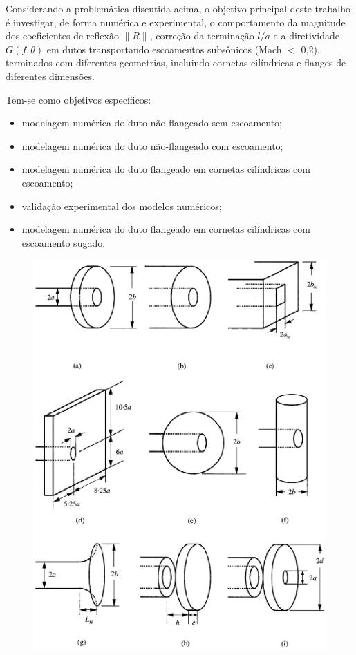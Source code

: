 Considerando a problemática discutida acima, o objetivo principal deste trabalho é investigar, de forma numérica e experimental, o comportamento da magnitude dos coeficientes de reflexão $\|R\|$, correção da terminação $l/a$ e a diretividade $G(f,\theta)$ em dutos transportando escoamentos subsônicos (Mach $<$ 0,2), terminados com diferentes geometrias, incluindo cornetas cilíndricas e flanges de diferentes dimensões.

Tem-se como objetivos específicos:
\begin{itemize}
    \item modelagem numérica do duto não-flangeado sem escoamento;
    \item modelagem numérica do duto não-flangeado com escoamento;
    \item modelagem numérica do duto flangeado em cornetas cilíndricas com escoamento;
    \item validação experimental dos modelos numéricos;
    \item modelagem numérica do duto flangeado em cornetas cilíndricas com escoamento sugado.
\end{itemize}

\begin{figure}[ht!]
\centering
  \includegraphics[width=.61\linewidth]{figuras/diferentes_dutos.eps}
  \\
  \label{fig:diferentes_dutos}
\end{figure}



